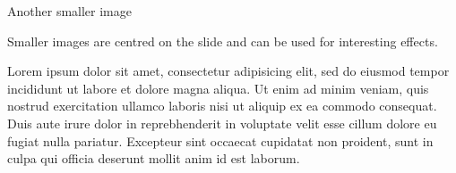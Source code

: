 \documentclass[aspectratio=169]{beamer}
\begin{document}
\begin{frame}[div=0.6\paperwidth]{Another smaller image}
  \begin{minipage}{0.625\linewidth}
    \raggedright
    Smaller images are centred on the slide and can be used for interesting effects.
    \medskip

    Lorem ipsum dolor sit amet, consectetur adipisicing elit, sed do eiusmod
    tempor incididunt ut labore et dolore magna aliqua. Ut enim ad minim veniam,
    quis nostrud exercitation ullamco laboris nisi ut aliquip ex ea commodo
    consequat. Duis aute irure dolor in reprebhenderit in voluptate velit esse
    cillum dolore eu fugiat nulla pariatur. Excepteur sint occaecat cupidatat non
    proident, sunt in culpa qui officia deserunt mollit anim id est laborum.
  \end{minipage}
\end{frame}




\end{document}
